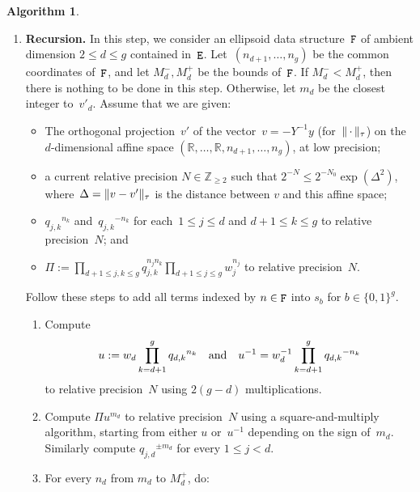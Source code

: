 \documentclass[12pt,oneside]{amsart}
\numberwithin{equation}{section}
\theoremstyle{definition}
\newtheorem{algorithm}[equation]{Algorithm}
\newcommand{\Z}{\mathbb{Z}}
\newcommand{\R}{\mathbb{R}}
\newcommand{\placeholder}{\,\cdot\,}
\DeclareMathOperator{\E}{\tt E}
\DeclareMathOperator{\eldF}{\tt F}
\DeclarePairedDelimiter{\norm}{\|}{\|}
\begin{document}
\begin{algorithm}
\begin{enumerate}
  \item \label{step:summation-rec} \textbf{Recursion.} In this step, we
    consider an ellipsoid data structure~$\eldF$ of ambient dimension
    $2\leq d\leq g$ contained in~$\E$. Let~$(n_{d+1},\ldots,n_g)$ be the common
    coordinates of~$\eldF$, and let $M_d^-, M_d^+$ be the bounds of~$\eldF$. If
    $M_d^- < M_d^+$, then there is nothing to be done in this step. Otherwise,
    let $m_d$ be the closest integer to~$v'_d$.  Assume that we are
    given:
    \begin{itemize}[topsep=2pt, itemsep=2pt]
    \item The orthogonal projection~$v'$ of the vector~$v = -Y^{-1}y$
      (for~$\norm{\placeholder}_\tau$) on the $d$-dimensional affine space
      $(\R,\ldots,\R,n_{d+1},\ldots,n_g)$, at low precision;
    \item a current relative precision $N\in \Z_{\geq 2}$ such that
      $2^{-N} \leq 2^{-N_0} \exp(\Delta^2)$, where~$\Delta = \norm{v-v'}_\tau$
      is the distance between $v$ and this affine space;
    \item ${q_{j,k}}^{n_k}$ and~${q_{j,k}}^{-n_k}$ for each~$1\leq j\leq d$ and
      $d+1\leq k\leq g$ to relative precision~$N$; and
    \item
      $\Pi := \displaystyle \prod_{d+1\leq j, k\leq g} q_{j,k}^{n_j n_k}
      \prod_{d+1\leq j\leq g} w_j^{n_j}$ to relative precision~$N$.
    \end{itemize}
    Follow these steps to add all terms indexed by
    $n\in \eldF$ into $s_b$ for $b\in \{0,1\}^g$.
    \begin{enumerate}
    \item Compute \vspace{-4mm}
      \begin{displaymath}
        u := w_d \prod_{k=d+1}^g
        {q_{d,k}}^{n_k} \quad \text{and}\quad
        u^{-1} = w_d^{-1} \prod_{k=d+1}^g {q_{d,k}}^{-n_k} \vspace{-2mm}
      \end{displaymath}
      to relative precision~$N$ using $2(g-d)$ multiplications.
    \item Compute $\Pi u^{m_d}$ to relative precision~$N$ using a
      square-and-multiply algorithm, starting from either $u$ or~$u^{-1}$
      depending on the sign of~$m_d$. Similarly compute ${q_{j, d}}^{\pm m_d}$
      for every $1\leq j < d$.
    \item  For every $n_d$ from $m_d$ to $M_d^+$, do:
      \begin{enumerate}

\end{enumerate}
\end{enumerate}
\end{enumerate}
\end{algorithm}
\end{document}
